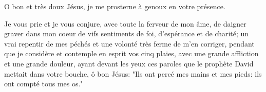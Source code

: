 O bon et très doux Jésus,
je me prosterne à genoux
en votre présence.

Je vous prie
et je vous conjure,
avec toute la ferveur de mon âme,
de daigner graver dans mon coeur
de vifs sentiments de foi,
d'espérance et de charité;
un vrai repentir de mes péchés
et une volonté très ferme
de m'en corriger,
pendant que je considère
et contemple en esprit vos cinq plaies,
avec une grande affliction
et une grande douleur,
ayant devant les yeux
ces paroles que le prophète David
mettait dans votre bouche,
ô bon Jésus:
"Ils ont percé mes mains et mes pieds:
ils ont compté tous mes os."